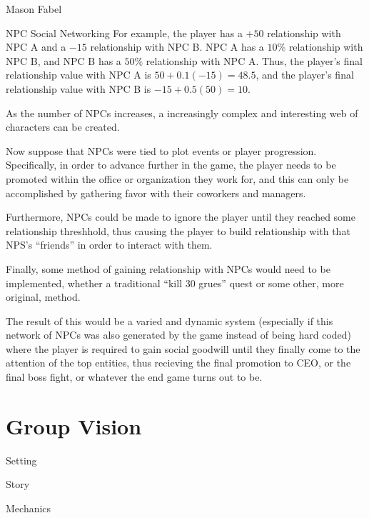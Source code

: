 \documentclass[12pt]{report}
\begin{document}
\begin{section}{Mason Fabel}
\begin{subsection}{NPC Social Networking}
For example, the player has a $+50$ relationship with NPC A and a $-15$
relationship with NPC B. NPC A has a $10\%$ relationship with NPC B, and
NPC B has a $50\%$ relationship with NPC A. Thus, the player's final
relationship value with NPC A is $50+0.1(-15)=48.5$, and the player's
final relationship value with NPC B is $-15+0.5(50)=10$.

As the number of NPCs increases, a increasingly complex and interesting web
of characters can be created.

Now suppose that NPCs were tied to plot events or player progression.
Specifically, in order to advance further in the game, the player needs
to be promoted within the office or organization they work for, and this
can only be accomplished by gathering favor with their coworkers and
managers.

Furthermore, NPCs could be made to ignore the player until they reached
some relationship threshhold, thus causing the player to build relationship
with that NPS's ``friends'' in order to interact with them.

Finally, some method of gaining relationship with NPCs would need to be
implemented, whether a traditional ``kill 30 grues'' quest or some other,
more original, method.

The result of this would be a varied and dynamic system (especially if this
network of NPCs was also generated by the game instead of being hard coded)
where the player is required to gain social goodwill until they finally
come to the attention of the top entities, thus recieving the final
promotion to CEO, or the final boss fight, or whatever the end game turns
out to be.
\end{subsection}

\end{section}

\chapter{Group Vision}


\begin{section}{Setting}
\end{section}

\begin{section}{Story}
\end{section}

\begin{section}{Mechanics}
\end{section}
\end{document}
